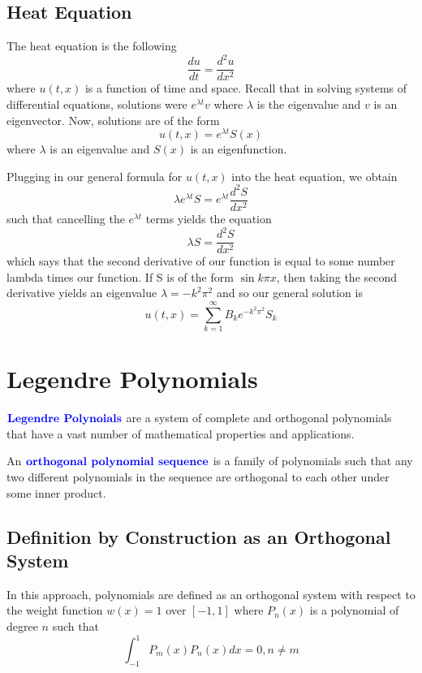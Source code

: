 \documentclass[12pt]{scrartcl}
\begin{document}
\subsection{Heat Equation}

The heat equation is the following
\[\frac{du}{dt} = \frac{d^2u}{dx^2}\] where $u(t, x)$ is a function of time and space. Recall that in solving systems of differential equations, solutions were $e^{\lambda t}v$ where $\lambda$ is the eigenvalue and $v$ is an eigenvector. Now, solutions are of the form 
\[u(t,x) = e^{\lambda t}S(x)\] where $\lambda$ is an eigenvalue and $S(x)$ is an eigenfunction.

Plugging in our general formula for $u(t,x)$ into the heat equation, we obtain
\[\lambda e^{\lambda t}S = e^{\lambda t}\frac{d^2S}{dx^2}\]
such that cancelling the $e^{\lambda t}$ terms yields
the equation
\[\lambda S = \frac{d^2S}{dx^2}\] which says that the second derivative of our function is equal to some number lambda times our function. If S is of the form $\sin k\pi x$, then taking the second derivative yields an eigenvalue $\lambda = -k^2\pi^2$ and so our general solution is 
\[u(t,x) = \sum_{k=1}^\infty B_ke^{-k^2\pi^2}S_k\]

\section{Legendre Polynomials}

\begin{definition}
    $\textbf{\color{blue} Legendre Polynoials}$ are a system of complete and orthogonal polynomials that have a vast number of mathematical properties and applications.
\end{definition}

\begin{definition}
    An $\textbf{\color{blue} orthogonal polynomial sequence}$ is a family of polynomials such that any two different polynomials in the sequence are orthogonal to each other under some inner product.
\end{definition}

\subsection{Definition by Construction as an Orthogonal System}

\begin{definition}
    In this approach, polynomials are defined as an orthogonal system with respect to the weight function $w(x) = 1$ over $[-1, 1]$ where $P_n(x)$ is a polynomial of degree $n$ such that 
    \[\int_{-1}^1 P_m(x)P_n(x) dx = 0, n \neq m\]
\end{definition}
\end{document}
